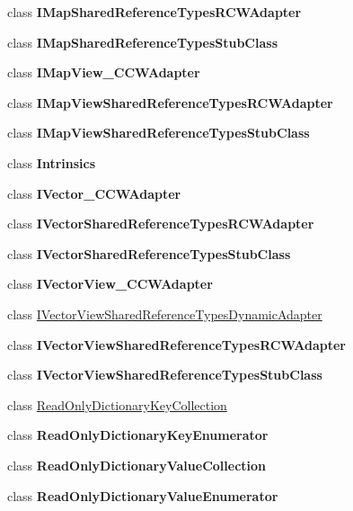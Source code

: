 \begin{DoxyCompactItemize}
class {\bfseries I\+Map\+Shared\+Reference\+Types\+R\+C\+W\+Adapter}
\item 
class {\bfseries I\+Map\+Shared\+Reference\+Types\+Stub\+Class}
\item 
class {\bfseries I\+Map\+View\+\_\+\+C\+C\+W\+Adapter}
\item 
class {\bfseries I\+Map\+View\+Shared\+Reference\+Types\+R\+C\+W\+Adapter}
\item 
class {\bfseries I\+Map\+View\+Shared\+Reference\+Types\+Stub\+Class}
\item 
class {\bfseries Intrinsics}
\item 
class {\bfseries I\+Vector\+\_\+\+C\+C\+W\+Adapter}
\item 
class {\bfseries I\+Vector\+Shared\+Reference\+Types\+R\+C\+W\+Adapter}
\item 
class {\bfseries I\+Vector\+Shared\+Reference\+Types\+Stub\+Class}
\item 
class {\bfseries I\+Vector\+View\+\_\+\+C\+C\+W\+Adapter}
\item 
class \hyperlink{class_system_1_1_runtime_1_1_interop_services_1_1_windows_runtime_1_1_i_vector_view_shared_reference_types_dynamic_adapter}{I\+Vector\+View\+Shared\+Reference\+Types\+Dynamic\+Adapter}
\item 
class {\bfseries I\+Vector\+View\+Shared\+Reference\+Types\+R\+C\+W\+Adapter}
\item 
class {\bfseries I\+Vector\+View\+Shared\+Reference\+Types\+Stub\+Class}
\item 
class \hyperlink{class_system_1_1_runtime_1_1_interop_services_1_1_windows_runtime_1_1_read_only_dictionary_key_collection}{Read\+Only\+Dictionary\+Key\+Collection}
\item 
class {\bfseries Read\+Only\+Dictionary\+Key\+Enumerator}
\item 
class {\bfseries Read\+Only\+Dictionary\+Value\+Collection}
\item 
class {\bfseries Read\+Only\+Dictionary\+Value\+Enumerator}
\end{DoxyCompactItemize}
